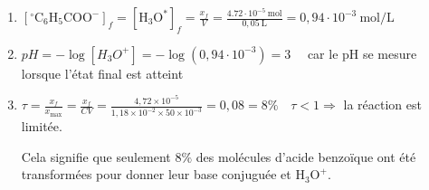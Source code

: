 \begin{enumerate}
    $$
    \begin{gathered}
    x_f=\frac{\sigma \cdot V}{\lambda_{\left(c_f f_f, 000^{-}\right)}+\lambda_{\left(H_3 O^{+}\right)}} \\
    x_f=\frac{36,1 \cdot 10^{-3} S m^{-1} \cdot 50 \cdot 10^{-6} m^3}{(35+3,23) \cdot 10^{-3} S \cdot m^2 m o l^{-1}}=4,72 \cdot 10^{-5} \mathrm{~mol}
    \end{gathered}
    $$
    \item $\left[{ }^{\circ} \mathrm{C}_6 \mathrm{H}_5 \mathrm{COO}^{-}\right]_f=\left[\mathrm{H}_3 \mathrm{O}^*\right]_f=\frac{x_f}{V}=\frac{4.72 \cdot 10^{-5} \mathrm{~mol}}{0,05 \mathrm{~L}}=0,94 \cdot 10^{-3} \mathrm{~mol} / \mathrm{L}$
    \item $p H=-\log \left[H_3 O^{+}\right]=-\log \left(0,94 \cdot 10^{-3}\right)=3 \quad$ car le pH se mesure lorsque l'état final est atteint
    \item $\tau=\frac{x_f}{x_{\max }}=\frac{x_f}{C V}=\frac{4,72 \times 10^{-5}}{1,18 \times 10^{-2} \times 50 \times 10^{-3}}=0,08=8 \% \quad \tau<1 \Rightarrow$ la réaction est limitée.

    Cela signifie que seulement $8 \%$ des molécules d'acide benzoïque ont été transformées pour donner leur base conjuguée et $\mathrm{H}_3 \mathrm{O}^{+}$.
\end{enumerate}


